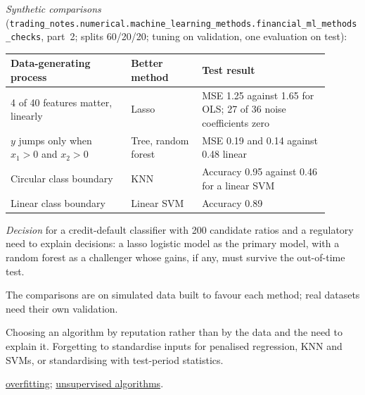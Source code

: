 \begin{qfmethod}
 \emph{Synthetic comparisons} (\nolinkurl{trading_notes.numerical.machine_learning_methods.financial_ml_methods_checks}, part~2; splits 60/20/20; tuning on validation, one evaluation on test):
\begin{center}\small
\begin{tabular}{@{}p{0.34\linewidth}p{0.2\linewidth}p{0.36\linewidth}@{}}
\toprule
Data-generating process & Better method & Test result \\
\midrule
4 of 40 features matter, linearly & Lasso & MSE 1.25 against 1.65 for OLS; 27 of 36 noise coefficients zero \\
$y$ jumps only when $x_1>0$ and $x_2>0$ & Tree, random forest & MSE 0.19 and 0.14 against 0.48 linear \\
Circular class boundary & KNN & Accuracy 0.95 against 0.46 for a linear SVM \\
Linear class boundary & Linear SVM & Accuracy 0.89 \\
\bottomrule
\end{tabular}
\end{center}
\emph{Decision} for a credit-default classifier with 200 candidate ratios and a regulatory need to explain decisions: a lasso logistic model as the primary model, with a random forest as a challenger whose gains, if any, must survive the out-of-time test.

 The comparisons are on simulated data built to favour each method; real datasets need their own validation.

 Choosing an algorithm by reputation rather than by the data and the need to explain it. Forgetting to standardise inputs for penalised regression, KNN and SVMs, or standardising with test-period statistics.

 \hyperref[def:learning-methods-overfitting]{overfitting}; \hyperref[meth:unsupervised-algorithm-selection]{unsupervised algorithms}.

\end{qfmethod}

